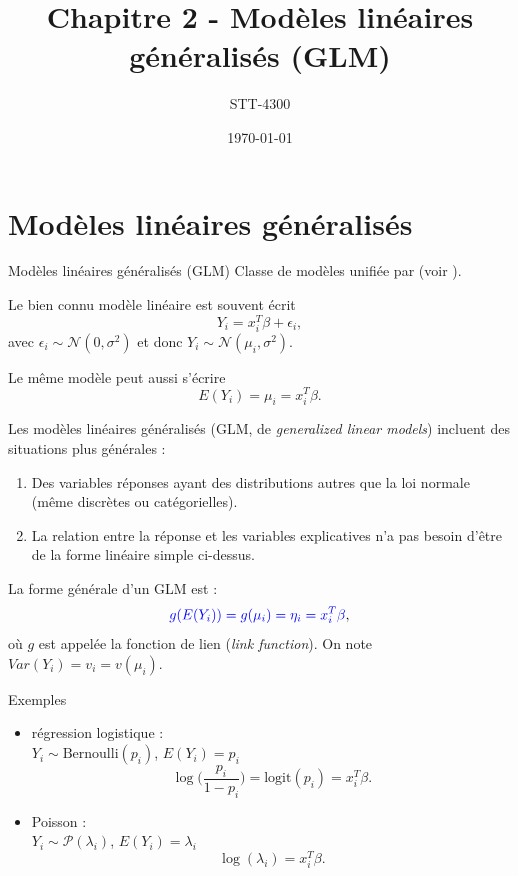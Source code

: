 \documentclass{BeamerTemplate}
\title{Chapitre 2 - Modèles linéaires généralisés (GLM)}
\subtitle{STT-4300}
\date{\today}
\begin{document}
\begin{refsection}

\begin{frame}[t]
\titlepage
\end{frame}

\section{Modèles linéaires généralisés}

\begin{frame}{Modèles linéaires généralisés (GLM)}
Classe de modèles unifiée par  (voir ).

\bigskip

Le bien connu {\color{blue}modèle linéaire} est souvent écrit
$$Y_i = x_i^T \beta + \epsilon_i,$$
avec $\epsilon_i \sim {\mathcal N}(0,\sigma^2)$ et donc $Y_i \sim {\mathcal N}(\mu_i,\sigma^2)$.

Le même modèle peut aussi s'écrire
$$E(Y_i) = \mu_i = x_i^T \beta.$$
\end{frame}

\begin{frame}{}
Les modèles linéaires généralisés (GLM, de \textit{generalized linear models}) incluent des situations plus générales :
\begin{enumerate}
\item Des variables réponses ayant des distributions autres que la loi
  normale (même discrètes ou catégorielles).
\item La relation entre la réponse et les variables explicatives
  n'a pas besoin d'être de la forme linéaire simple ci-dessus.
\end{enumerate}

La forme générale d'un GLM est :
$${\color{blue}g(E(Y_i)) = g(\mu_i)=\eta_i=x_i^T \beta},$$
où $g$ est appelée la fonction de lien (\textit{link function}). On note $Var(Y_i) = v_i = v(\mu_i)$.

\end{frame}


\begin{frame}{Exemples}

\begin{itemize}
\item régression logistique :\\
 $Y_i \sim  \text{Bernoulli}(p_i)$, $E(Y_i) = p_i$
$$\log\Big(\frac{p_i}{1-p_i}\Big) = \mbox{logit}(p_i) = x_i^T \beta.$$
\item  Poisson :\\
$Y_i \sim {\mathcal P}(\lambda_i)$, $E(Y_i) = \lambda_i$
$$\log(\lambda_i) = x_i^T \beta.$$
\end{itemize}


\end{frame}
\end{refsection}
\end{document}
